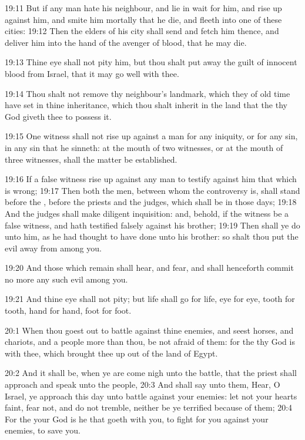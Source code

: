 19:11 But if any man hate his neighbour, and lie in wait for him, and rise up against him, and smite him mortally that he die, and fleeth into one of these cities: 19:12 Then the elders of his city shall send and fetch him thence, and deliver him into the hand of the avenger of blood, that he may die.

19:13 Thine eye shall not pity him, but thou shalt put away the guilt of innocent blood from Israel, that it may go well with thee.

19:14 Thou shalt not remove thy neighbour's landmark, which they of old time have set in thine inheritance, which thou shalt inherit in the land that the \LORD thy God giveth thee to possess it.

19:15 One witness shall not rise up against a man for any iniquity, or for any sin, in any sin that he sinneth: at the mouth of two witnesses, or at the mouth of three witnesses, shall the matter be established.

19:16 If a false witness rise up against any man to testify against him that which is wrong; 19:17 Then both the men, between whom the controversy is, shall stand before the \LORD, before the priests and the judges, which shall be in those days; 19:18 And the judges shall make diligent inquisition: and, behold, if the witness be a false witness, and hath testified falsely against his brother; 19:19 Then shall ye do unto him, as he had thought to have done unto his brother: so shalt thou put the evil away from among you.

19:20 And those which remain shall hear, and fear, and shall henceforth commit no more any such evil among you.

19:21 And thine eye shall not pity; but life shall go for life, eye for eye, tooth for tooth, hand for hand, foot for foot.

20:1 When thou goest out to battle against thine enemies, and seest horses, and chariots, and a people more than thou, be not afraid of them: for the \LORD thy God is with thee, which brought thee up out of the land of Egypt.

20:2 And it shall be, when ye are come nigh unto the battle, that the priest shall approach and speak unto the people, 20:3 And shall say unto them, Hear, O Israel, ye approach this day unto battle against your enemies: let not your hearts faint, fear not, and do not tremble, neither be ye terrified because of them; 20:4 For the \LORD your God is he that goeth with you, to fight for you against your enemies, to save you.

